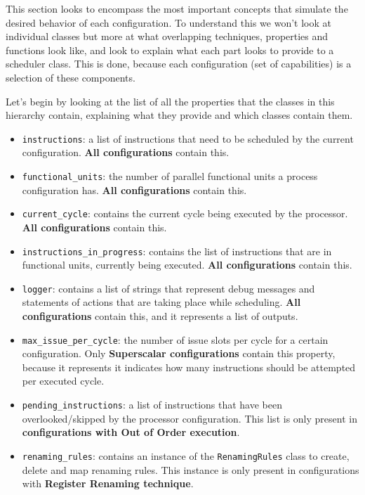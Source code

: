 \documentclass{article}
\begin{document}
This section looks to encompass the most important concepts that simulate the desired behavior of each configuration. To understand this we won't look at individual classes but more at what overlapping techniques, properties and functions look like, and look to explain what each part looks to provide to a scheduler class.  This is done, because each configuration (set of capabilities) is a selection of these components. 

Let's begin by looking at the list of all the properties that the classes in this hierarchy contain, explaining what they provide and which classes contain them.

\begin{itemize}
    \item \lstinline|instructions|: a list of instructions that need to be scheduled by the current configuration. \textbf{All configurations} contain this. 
    \item \lstinline|functional_units|: the number of parallel functional units a process configuration has. \textbf{All configurations} contain this.
    \item \lstinline|current_cycle|: contains the current cycle being executed by the processor. \textbf{All configurations} contain this.
    \item \lstinline|instructions_in_progress|: contains the list of instructions that are in functional units, currently being executed. \textbf{All configurations} contain this.
    \item \lstinline|logger|: contains a list of strings that represent debug messages and statements of actions that are taking place while scheduling. \textbf{All configurations} contain this, and it represents a list of outputs.
    \item \lstinline|max_issue_per_cycle|: the number of issue slots per cycle for a certain configuration. Only \textbf{Superscalar configurations} contain this property, because it represents it indicates how many instructions should be attempted per executed cycle.
    \item \lstinline|pending_instructions|: a list of instructions that have been overlooked/skipped by the processor configuration. This list is only present in \textbf{configurations with Out of Order execution}.
    \item \lstinline|renaming_rules|: contains an instance of the \lstinline|RenamingRules| class to create, delete and map renaming rules. This instance is only present in configurations with \textbf{Register Renaming technique}. 
\end{itemize}
\end{document}
